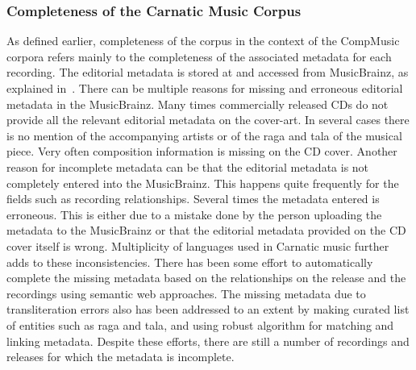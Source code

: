 \subsubsection{Completeness of the Carnatic Music Corpus}
\label{sec:corpus_completeness_of_completeness_of_carnatic_music_corpus}

As defined earlier, completeness of the corpus in the context of the CompMusic corpora refers mainly to the completeness of the associated metadata
for each recording. The editorial metadata is stored at and accessed from MusicBrainz, as explained in~. There can be multiple reasons for missing and erroneous editorial metadata in the MusicBrainz. Many times commercially released CDs do not provide all the relevant editorial metadata on the cover-art. In several cases there is no mention of the accompanying artists or of the \gls{raga} and \gls{tala} of the musical piece. Very often composition information is missing on the CD cover. Another reason for incomplete metadata can be that the editorial metadata is not completely entered into the MusicBrainz. This happens quite frequently for the fields such as recording relationships. Several times the metadata entered is erroneous. This is either due to a mistake done by the person uploading the metadata to the MusicBrainz or that the editorial metadata provided on the CD cover itself is wrong. Multiplicity of languages used in Carnatic music further adds to these inconsistencies. There has been some effort to automatically complete the missing metadata based on the relationships on the release and the recordings using semantic web approaches. The missing metadata due to transliteration errors also has been addressed to an extent by making curated list of entities such as \gls{raga} and \gls{tala}, and using robust algorithm for matching and linking metadata. Despite these efforts, there are still a number of recordings and releases for which the metadata is incomplete.


